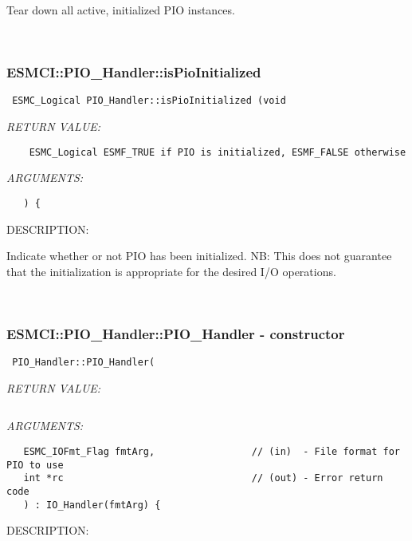       Tear down all active, initialized PIO instances.
   
 
\mbox{}\hrulefill\
 
\subsubsection [ESMCI::PIO\_Handler::isPioInitialized] {ESMCI::PIO\_Handler::isPioInitialized}


  
\begin{verbatim} ESMC_Logical PIO_Handler::isPioInitialized (void\end{verbatim}{\em RETURN VALUE:}
\begin{verbatim}    ESMC_Logical ESMF_TRUE if PIO is initialized, ESMF_FALSE otherwise\end{verbatim}{\em ARGUMENTS:}
\begin{verbatim}   ) {\end{verbatim}
{\sf DESCRIPTION:\\ }


      Indicate whether or not PIO has been initialized.
      NB: This does not guarantee that the initialization is appropriate
          for the desired I/O operations.
   
 
\mbox{}\hrulefill\
 
\subsubsection [ESMCI::PIO\_Handler::PIO\_Handler] {ESMCI::PIO\_Handler::PIO\_Handler - constructor}


  
\begin{verbatim} PIO_Handler::PIO_Handler(\end{verbatim}{\em RETURN VALUE:}
\begin{verbatim}      \end{verbatim}{\em ARGUMENTS:}
\begin{verbatim}   ESMC_IOFmt_Flag fmtArg,                 // (in)  - File format for PIO to use
   int *rc                                 // (out) - Error return code
   ) : IO_Handler(fmtArg) {\end{verbatim}
{\sf DESCRIPTION:\\ }


